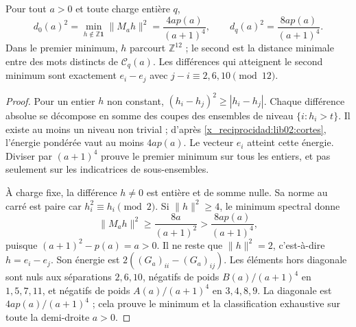 \begin{theorem}
\label{x_reciprocidad:lib02:distancias}
Pour tout \(a>0\) et toute charge entière \(q\),
\begin{equation}
 d_0(a)^2=\min_{h\notin\mathbb Z\mathbf1}\|M_ah\|^2
 =\frac{4ap(a)}{(a+1)^4},\qquad
 d_q(a)^2=\frac{8ap(a)}{(a+1)^4}.
 \label{x_reciprocidad:lib02:distancias-exactas}
\end{equation}
Dans le premier minimum, \(h\) parcourt \(\mathbb Z^{12}\) ; le second
est la distance minimale entre des mots distincts de \(\mathcal C_q(a)\).
Les différences qui atteignent le second minimum sont exactement
\(e_i-e_j\) avec \(j-i\equiv2,6,10\pmod{12}\).
\end{theorem}
\begin{proof}
Pour un entier \(h\) non constant, \((h_i-h_j)^2\geq|h_i-h_j|\). Chaque différence absolue se décompose en somme des coupes des ensembles de niveau \(\{i:h_i>t\}\). Il existe au moins un niveau non trivial ; d'après \cref{x_reciprocidad:lib02:cortes}, l'énergie pondérée vaut au moins \(4ap(a)\). Le vecteur \(e_i\) atteint cette énergie. Diviser par \((a+1)^4\) prouve le premier minimum sur tous les entiers, et pas seulement sur les indicatrices de sous-ensembles.

À charge fixe, la différence \(h\ne0\) est entière et de somme nulle.
Sa norme au carré est paire car \(h_i^2\equiv h_i\pmod2\). Si
\(\|h\|^2\geq4\), le minimum spectral donne
\[
 \|M_ah\|^2\geq\frac{8a}{(a+1)^2}
 >\frac{8ap(a)}{(a+1)^4},
\]
puisque \((a+1)^2-p(a)=a>0\). Il ne reste que
\(\|h\|^2=2\), c’est-à-dire \(h=e_i-e_j\). Son énergie est
\(2((G_a)_{ii}-(G_a)_{ij})\). Les éléments hors diagonale sont nuls
aux séparations \(2,6,10\), négatifs de poids \(B(a)/(a+1)^4\)
en \(1,5,7,11\), et négatifs de poids \(A(a)/(a+1)^4\) en
\(3,4,8,9\). La diagonale est \(4ap(a)/(a+1)^4\) ; cela prouve le
minimum et la classification exhaustive sur toute la demi-droite \(a>0\).
\end{proof}

